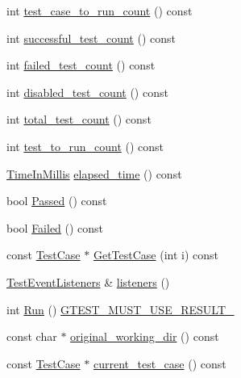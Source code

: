 \begin{DoxyCompactItemize}
int \hyperlink{classtesting_1_1UnitTest_adf212bae576e88dfb77bd114f01bc117}{test\-\_\-case\-\_\-to\-\_\-run\-\_\-count} () const 
\item 
int \hyperlink{classtesting_1_1UnitTest_ab955f67bc1fe8ef62a7e72906ccece2a}{successful\-\_\-test\-\_\-count} () const 
\item 
int \hyperlink{classtesting_1_1UnitTest_afd8bbd35c7ee99960abb321cfdff3119}{failed\-\_\-test\-\_\-count} () const 
\item 
int \hyperlink{classtesting_1_1UnitTest_a10ec677118627074973fc20c9271b204}{disabled\-\_\-test\-\_\-count} () const 
\item 
int \hyperlink{classtesting_1_1UnitTest_a0eb7286957aeb126d9926c33407a15a3}{total\-\_\-test\-\_\-count} () const 
\item 
int \hyperlink{classtesting_1_1UnitTest_aa6eccf86072f4f8ddd0bea30dfd45912}{test\-\_\-to\-\_\-run\-\_\-count} () const 
\item 
\hyperlink{namespacetesting_a338e9fd9474f0d8fafcb28b05f66a630}{\-Time\-In\-Millis} \hyperlink{classtesting_1_1UnitTest_a10ad329997f481d3f6af8ff075dacf76}{elapsed\-\_\-time} () const 
\item 
bool \hyperlink{classtesting_1_1UnitTest_ac97d5073365af8a73262fd9f6bf18656}{\-Passed} () const 
\item 
bool \hyperlink{classtesting_1_1UnitTest_a7cf078354304c964c1934f53bf2bb4d7}{\-Failed} () const 
\item 
const \hyperlink{classtesting_1_1TestCase}{\-Test\-Case} $\ast$ \hyperlink{classtesting_1_1UnitTest_a20fd6bc6d3cb5467f228ce22997455b1}{\-Get\-Test\-Case} (int i) const 
\item 
\hyperlink{classtesting_1_1TestEventListeners}{\-Test\-Event\-Listeners} \& \hyperlink{classtesting_1_1UnitTest_aeb82a98c4da4afafa5b68547c8ac380a}{listeners} ()
\item 
int \hyperlink{classtesting_1_1UnitTest_a22f3e90081aaad35b4eccfa93a28042c}{\-Run} () \hyperlink{gtest-port_8h_a8e5aab8276b2645f64f41c9e3021b935}{\-G\-T\-E\-S\-T\-\_\-\-M\-U\-S\-T\-\_\-\-U\-S\-E\-\_\-\-R\-E\-S\-U\-L\-T\-\_\-}
\item 
const char $\ast$ \hyperlink{classtesting_1_1UnitTest_adceb6e6c2e1029b9b35c24418a52a58f}{original\-\_\-working\-\_\-dir} () const 
\item 
const \hyperlink{classtesting_1_1TestCase}{\-Test\-Case} $\ast$ \hyperlink{classtesting_1_1UnitTest_af774518d9be68f728e9fffb00433ce69}{current\-\_\-test\-\_\-case} () const 
\item 

\end{DoxyCompactItemize}
